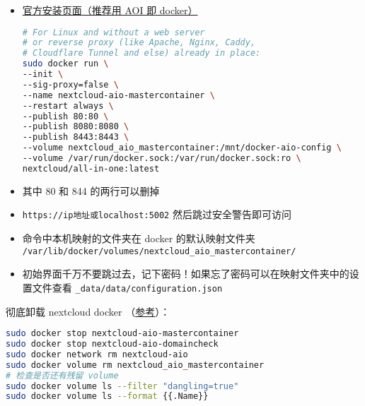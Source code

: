 
\begin{itemize}
\item \href{https://nextcloud.com/install/}{官方安装页面（推荐用 AOI 即 docker）}
\begin{lstlisting}[language=bash]
# For Linux and without a web server
# or reverse proxy (like Apache, Nginx, Caddy,
# Cloudflare Tunnel and else) already in place:
sudo docker run \
--init \
--sig-proxy=false \
--name nextcloud-aio-mastercontainer \
--restart always \
--publish 80:80 \
--publish 8080:8080 \
--publish 8443:8443 \
--volume nextcloud_aio_mastercontainer:/mnt/docker-aio-config \
--volume /var/run/docker.sock:/var/run/docker.sock:ro \
nextcloud/all-in-one:latest
\end{lstlisting}
\item 其中 80 和 844 的两行可以删掉
\item \verb`https://ip地址或localhost:5002` 然后跳过安全警告即可访问
\item 命令中本机映射的文件夹在 docker 的默认映射文件夹 \verb`/var/lib/docker/volumes/nextcloud_aio_mastercontainer/`
\item 初始界面千万不要跳过去，记下密码！如果忘了密码可以在映射文件夹中的设置文件查看 \verb`_data/data/configuration.json`
\end{itemize}


彻底卸载 nextcloud docker （\href{https://github.com/nextcloud/all-in-one#how-to-properly-reset-the-instance}{参考}）：
\begin{lstlisting}[language=bash]
sudo docker stop nextcloud-aio-mastercontainer
sudo docker stop nextcloud-aio-domaincheck
sudo docker network rm nextcloud-aio
sudo docker volume rm nextcloud_aio_mastercontainer
# 检查是否还有残留 volume
sudo docker volume ls --filter "dangling=true"
sudo docker volume ls --format {{.Name}}
\end{lstlisting}
